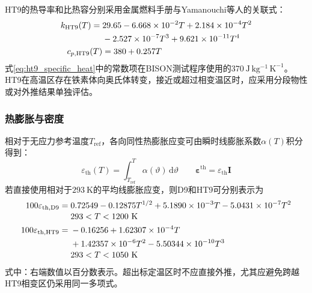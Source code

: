 HT9的热导率和比热容分别采用金属燃料手册与Yamanouchi等人的关联式\cite{hofmanMetallicFuelsHandbook2019,Yamanouchi_1992}：
\begin{subequations}\label{eq:ht9_thermal_properties}
	\begin{align}
		k_{\mathrm{HT9}}(T)
		={}&29.65-6.668\times10^{-2}T
		+2.184\times10^{-4}T^2
		\notag\\
		&-2.527\times10^{-7}T^3
		+9.621\times10^{-11}T^4
		\label{eq:ht9_thermal_conductivity}\\
		c_{p,\mathrm{HT9}}(T)
		&=380+0.257T
		\label{eq:ht9_specific_heat}
	\end{align}
\end{subequations}
式\eqref{eq:ht9_specific_heat}中的常数项在BISON测试程序使用的$370\ \mathrm{J\,kg^{-1}\,K^{-1}}$。HT9在高温区存在铁素体向奥氏体转变，接近或超过相变温区时，应采用分段物性或对外推结果单独评估。

\subsubsection{热膨胀与密度}

相对于无应力参考温度$T_{\mathrm{ref}}$，各向同性热膨胀应变可由瞬时线膨胀系数$\alpha(T)$积分得到：
\begin{equation}
	\varepsilon_{\mathrm{th}}(T)
	=\int_{T_{\mathrm{ref}}}^{T}\alpha(\vartheta)\,\mathrm d\vartheta
	\qquad
	\boldsymbol{\varepsilon}^{\mathrm{th}}
	=\varepsilon_{\mathrm{th}}\boldsymbol I
	\label{eq:clad_thermal_strain_general}
\end{equation}
若直接使用相对于$293\ \mathrm{K}$的平均线膨胀应变，则D9和HT9可分别表示为\cite{Leibowitz_1988,hofmanMetallicFuelsHandbook2019}
\begin{subequations}\label{eq:clad_d9_ht9_thermal_expansion}
	\begin{align}
		100\varepsilon_{\mathrm{th,D9}}
		={}&0.72549-0.12875T^{1/2}
		+5.1890\times10^{-3}T
		-5.0431\times10^{-7}T^2
		\nonumber\\[-0.2em]
		&293<T<1200\ \mathrm{K}
		\label{eq:d9_thermal_expansion}\\
		100\varepsilon_{\mathrm{th,HT9}}
		={}&-0.16256+1.62307\times10^{-4}T
		\notag\\
		&+1.42357\times10^{-6}T^2
		-5.50344\times10^{-10}T^3
		\nonumber\\[-0.2em]
		&293<T<1050\ \mathrm{K}
		\label{eq:ht9_thermal_expansion}
	\end{align}
\end{subequations}
式中：右端数值以百分数表示。超出标定温区时不应直接外推，尤其应避免跨越HT9相变区仍采用同一多项式。

